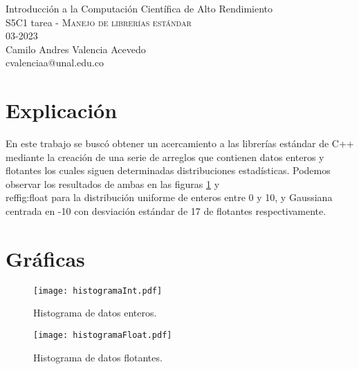 \documentclass[11pt,letterpaper]{exam}
\begin{document}
\begin{center}
{\Large Introducción a la Computación Científica de Alto Rendimiento} \\
S5C1 tarea - \textsc{Manejo de librerías estándar}\\
03-2023\\
Camilo Andres Valencia Acevedo\\
cvalenciaa@unal.edu.co
\end{center}


\section{Explicación}
En este trabajo se buscó obtener un acercamiento a las librerías estándar de C++ mediante la creación de una serie de arreglos que contienen datos enteros y flotantes los cuales siguen determinadas distribuciones estadísticas.
Podemos observar los resultados de ambas en las figuras \ref{fig:int} y \\ref{fig:float} para la distribución uniforme de enteros entre 0 y 10, y Gaussiana centrada en -10 con desviación estándar de 17 de flotantes respectivamente.

\noindent
\section{Gr\'aficas}
    \begin{figure}[H]
        \centering
        \texttt{[image: histogramaInt.pdf]} 
        \caption{Histograma de datos enteros.}
        \label{fig:int}
    \end{figure}

    \begin{figure}[H]
        \centering
        \texttt{[image: histogramaFloat.pdf]} 
        \caption{Histograma de datos flotantes.}
        \label{fig:float}
    \end{figure}
\end{document}
